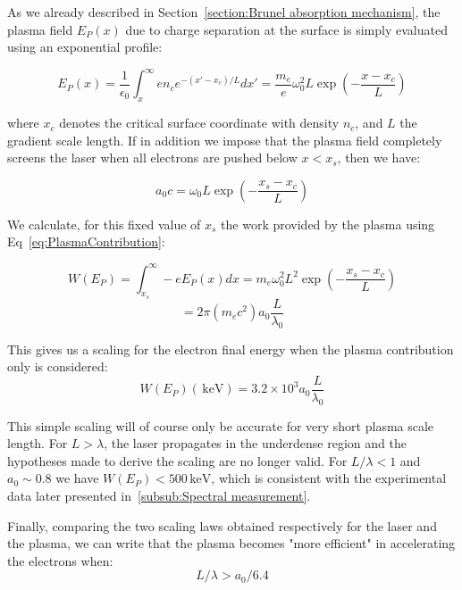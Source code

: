 \noindent As we already described in Section~\ref{section:Brunel absorption mechanism}, the plasma field $E_P(x)$ due to charge separation at the surface is simply evaluated using an exponential profile:

\begin{equation}
E_P(x) = \frac{1}{\epsilon_0}\int_{x}^{\infty}en_ce^{-(x'-x_c)/L}dx' = \frac{m_e}{e} \omega_0^2 L\exp(-\frac{x-x_c}{L})
\label{eq:PlasmaContribution}
\end{equation}

\noindent where $x_c$ denotes the critical surface coordinate with density $n_c$, and $L$ the gradient scale length. If in addition we impose that the plasma field completely screens the laser when all electrons are pushed below $x<x_s$, then we have:

\begin{equation}
\label{eq:a0vsplasma}
a_0  c= \omega_0L\exp(-\frac{x_s-x_c}{L})
\end{equation}

\noindent We calculate, for this fixed value of $x_s$ the work provided by the plasma using Eq~\ref{eq:PlasmaContribution}:

$$
W(E_P) = \int_{x_s}^{\infty}-eE_P(x)dx = m_e \omega_0^2  L^2 \exp(-\frac{x_s-x_c}{L})
$$
$$
= 2\pi  (m_e c^2)   a_0  \frac{L}{\lambda_0} 
$$

\noindent This gives us a scaling for the electron final energy when the plasma contribution only is considered:
\begin{equation}
W(E_P)(\,\mathrm{keV}) = 3.2 \times 10^3 a_0  \frac{L}{\lambda_0} 
\label{eq:ScaleLength}
\end{equation}

\noindent This simple scaling will of course only be accurate for very short plasma scale length. For $L>\lambda$, the laser propagates in the underdense region and the hypotheses made to derive the scaling are no longer valid.
For $L/\lambda < 1$ and $a_0\sim 0.8$ we have $W(E_P) < 500 \,\mathrm{keV}$, which is consistent with the experimental data later presented in~\ref{subsub:Spectral measurement}.

\noindent Finally, comparing the two scaling laws obtained respectively for the laser and the plasma, we can write that the plasma becomes "more efficient" in accelerating the electrons when:
$$
 L/\lambda > a_0/6.4
$$

